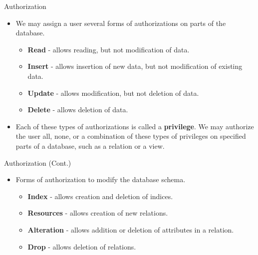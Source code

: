 \documentclass[aspectratio=169]{beamer}
\begin{document}
\begin{frame}{Authorization}
    \begin{itemize}
        \item We may assign a user several forms of authorizations on parts of the database.
        \begin{itemize}
            \item \textbf{Read} - allows reading, but not modification of data.
            \item \textbf{Insert} - allows insertion of new data, but not modification of existing data.
            \item \textbf{Update} - allows modification, but not deletion of data.
            \item \textbf{Delete} - allows deletion of data.
        \end{itemize}
        \item Each of these types of authorizations is called a \textbf{privilege}.  We may authorize the user all, none, or a combination of these types of privileges on specified parts of a database, such as a relation or a view.
    \end{itemize}
\end{frame}

\begin{frame}{Authorization (Cont.)}
    \begin{itemize}
        \item Forms of authorization to modify the database schema.
        \begin{itemize}
            \item \textbf{Index} - allows creation and deletion of indices.
            \item \textbf{Resources} - allows creation of new relations.
            \item \textbf{Alteration} - allows addition or deletion of attributes in a relation.
            \item \textbf{Drop} - allows deletion of relations.
        \end{itemize}
    \end{itemize}
\end{frame}
\end{document}
